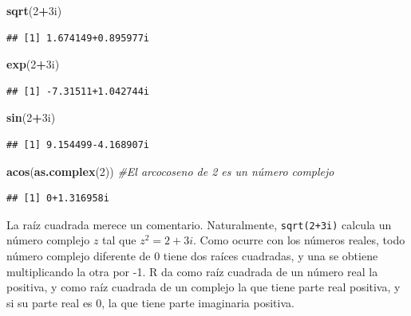 \documentclass[]{book}
\newenvironment{Shaded}{\begin{snugshade}}{\end{snugshade}}
\newcommand{\CommentTok}[1]{\textcolor[rgb]{0.56,0.35,0.01}{\textit{#1}}}
\newcommand{\DecValTok}[1]{\textcolor[rgb]{0.00,0.00,0.81}{#1}}
\newcommand{\KeywordTok}[1]{\textcolor[rgb]{0.13,0.29,0.53}{\textbf{#1}}}
\newcommand{\NormalTok}[1]{#1}
\newcommand{\OperatorTok}[1]{\textcolor[rgb]{0.81,0.36,0.00}{\textbf{#1}}}
\theoremstyle{definition}
\theoremstyle{definition}
\theoremstyle{definition}
\theoremstyle{remark}
\begin{document}
\begin{Shaded}
\begin{Highlighting}[]
\KeywordTok{sqrt}\NormalTok{(}\DecValTok{2}\OperatorTok{+}\NormalTok{3i)}
\end{Highlighting}
\end{Shaded}

\begin{verbatim}
## [1] 1.674149+0.895977i
\end{verbatim}

\begin{Shaded}
\begin{Highlighting}[]
\KeywordTok{exp}\NormalTok{(}\DecValTok{2}\OperatorTok{+}\NormalTok{3i)}
\end{Highlighting}
\end{Shaded}

\begin{verbatim}
## [1] -7.31511+1.042744i
\end{verbatim}

\begin{Shaded}
\begin{Highlighting}[]
\KeywordTok{sin}\NormalTok{(}\DecValTok{2}\OperatorTok{+}\NormalTok{3i)}
\end{Highlighting}
\end{Shaded}

\begin{verbatim}
## [1] 9.154499-4.168907i
\end{verbatim}

\begin{Shaded}
\begin{Highlighting}[]
\KeywordTok{acos}\NormalTok{(}\KeywordTok{as.complex}\NormalTok{(}\DecValTok{2}\NormalTok{)) }\CommentTok{#El arcocoseno de 2 es un número complejo}
\end{Highlighting}
\end{Shaded}

\begin{verbatim}
## [1] 0+1.316958i
\end{verbatim}

La raíz cuadrada merece un comentario. Naturalmente, \texttt{sqrt(2+3i)} calcula un número complejo \(z\) tal que \(z^2=2+3i\). Como ocurre con los números reales, todo número complejo diferente de 0 tiene dos raíces cuadradas, y una se obtiene multiplicando la otra por -1.
R da como raíz cuadrada de un número real la positiva, y como raíz cuadrada de un complejo la que tiene parte real positiva, y si su parte real es 0, la que tiene parte imaginaria positiva.
\end{document}
